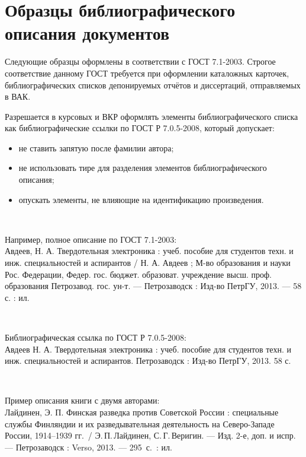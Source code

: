 \documentclass[utf8,12pt, coursreport]{G7-32}
\begin{document}

\appendix

\chapter{Образцы библиографического описания документов}

Следующие образцы оформлены в соответствии с ГОСТ 7.1-2003. Строгое соответствие данному ГОСТ требуется при оформлении каталожных карточек, библиографических списков депонируемых отчётов и диссертаций, отправляемых в ВАК. 

Разрешается в курсовых и ВКР оформлять элементы библиографического списка как библиографические ссылки по ГОСТ Р 7.0.5-2008, который допускает:
\begin{itemize}
\item не ставить запятую после фамилии автора;
\item не использовать тире для разделения элементов библиографического описания;
\item опускать элементы, не влияющие на идентификацию произведения.
\end{itemize}

~

Например, полное описание по ГОСТ 7.1-2003:\\
Авдеев, Н. А. Твердотельная электроника : учеб. пособие для студентов техн. и
инж. специальностей и аспирантов / Н. А. Авдеев ; М-во образования и науки Рос. Федерации, Федер. гос. бюджет. образоват. учреждение высш. проф. образования
Петрозавод. гос. ун-т. --- Петрозаводск : Изд-во ПетрГУ, 2013. --- 58 с. : ил.

~

Библиографическая ссылка по ГОСТ Р 7.0.5-2008:\\
Авдеев Н. А. Твердотельная электроника : учеб. пособие для студентов техн. и
инж. специальностей и аспирантов. Петрозаводск : Изд-во ПетрГУ, 2013. 58 с.

~

Пример описания книги с двумя авторами:\\
Лайдинен, Э. П. Финская разведка против Советской России : специальные
службы Финляндии и их разведывательная деятельность на Северо-Западе России,
1914--1939 гг.~/ Э.\,П.\,Лайдинен, С.\,Г.\,Веригин. --- Изд. 2-е, доп. и испр. --- Петрозаводск : Verso, 2013. --- 295~с.~: ил.
\end{document}
